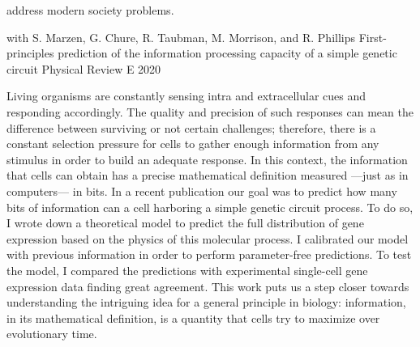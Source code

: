 \begin{cventries}
{\begin{cvitems}
{\begin{flushleft}
            address modern society problems.
          \end{flushleft}
            }
          \end{cvitems}
        }
        \cventry
        {with S. Marzen, G. Chure, R. Taubman, M. Morrison, and R. Phillips} %
        {First-principles prediction of the information processing capacity of a simple genetic circuit} %
        {Physical Review E} %
        {2020} %
        {
          \begin{cvitems} %
            \item {
            \begin{flushleft}
              Living organisms are constantly sensing intra and extracellular
              cues and responding accordingly. The quality and precision of such
              responses can mean the difference between surviving or not certain
              challenges; therefore, there is a constant selection pressure for
              cells to gather enough information from any stimulus in order to
              build an adequate response. In this context, the information that
              cells can obtain has a precise mathematical definition measured
              —just as in computers— in bits.\linebreak
              In a recent publication our goal was to predict how many bits of
              information can a cell harboring a simple genetic circuit process.
              To do so, I wrote down a theoretical model to predict the full
              distribution of gene expression based on the physics of this
              molecular process. I calibrated our model with previous
              information in order to perform parameter-free predictions. To
              test the model, I compared the predictions with experimental
              single-cell gene expression data finding great agreement.\linebreak
              This work puts us a step closer towards understanding the
              intriguing idea for a general principle in biology: information,
              in its mathematical definition, is a quantity that cells try to
              maximize over evolutionary time.\linebreak
          \end{flushleft}
            }
          \end{cvitems}
        }
    \end{cventries}